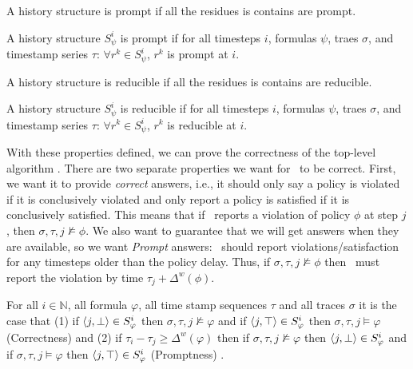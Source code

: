A history structure is prompt if all the residues is contains are prompt.
\begin{definition} A history structure $S^i_{\psi}$ is prompt if for all timesteps $i$, formulas $\psi$, traes $\sigma$, and timestamp series $\tau$: 
$\forall r^k \in S^i_{\psi}$, $r^k$ is prompt at $i$.
\end{definition}

A history structure is reducible if all the residues is contains are reducible.
\begin{definition} A history structure $S^i_{\psi}$ is reducible if for all timesteps $i$, formulas $\psi$, traes $\sigma$, and timestamp series $\tau$: 
$\forall r^k \in S^i_{\psi}$, $r^k$ is reducible at $i$.
\end{definition}

With these properties defined, we can prove the correctness of the top-level algorithm \agmon.
There are two separate properties we want for \agmon\ to be correct. First, we want it to provide \emph{correct} answers, i.e., it should only say a policy is violated if it is conclusively violated and only report a policy is satisfied if it is conclusively satisfied. 
This means that if \agmon\ reports a violation of policy $\phi$ at step $j$, then $\sigma, \tau, j \nvDash \phi$.
We also want to guarantee that we will get answers when they are available, so we want \emph{Prompt} answers: \agmon\ should report violations/satisfaction for any timesteps older than the policy delay. Thus, if $\sigma,\tau,j \nvDash \phi$ then \agmon\ must report the violation by time $\tau_j+\Delta^w(\phi)$.
%
\begin{theorem}
For all $i \in \mathbb{N}$, all formula $\varphi$, all time stamp sequences $\tau$ and all traces $\sigma$ it is the case that (1) if $\langle j, \bot \rangle \in S^i_{\varphi}$ then $\sigma, \tau, j \nvDash \varphi$ and if $\langle j, \top \rangle \in S^i_{\varphi}$ then $\sigma, \tau, j \vDash \varphi$ (Correctness) and (2) if $\tau_i - \tau_j \geq \Delta^{w}(\varphi)$ then if $\sigma, \tau, j \nvDash \varphi$ then $\langle j, \bot \rangle \in S^i_{\varphi}$ and if $\sigma, \tau, j \vDash \varphi$ then $\langle j, \top \rangle \in S^i_{\varphi}$ (Promptness)
.
\end{theorem}


